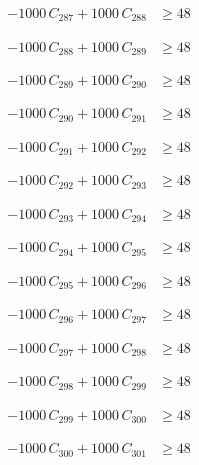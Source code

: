 \documentclass[a4paper,11pt]{article}
\begin{document}
\begin{align}
-1000\,C_{287} + 1000\,C_{288} &\geq 48 \nonumber
\end{align}

\begin{align}
-1000\,C_{288} + 1000\,C_{289} &\geq 48 \nonumber
\end{align}

\begin{align}
-1000\,C_{289} + 1000\,C_{290} &\geq 48 \nonumber
\end{align}

\begin{align}
-1000\,C_{290} + 1000\,C_{291} &\geq 48 \nonumber
\end{align}

\begin{align}
-1000\,C_{291} + 1000\,C_{292} &\geq 48 \nonumber
\end{align}

\begin{align}
-1000\,C_{292} + 1000\,C_{293} &\geq 48 \nonumber
\end{align}

\begin{align}
-1000\,C_{293} + 1000\,C_{294} &\geq 48 \nonumber
\end{align}

\begin{align}
-1000\,C_{294} + 1000\,C_{295} &\geq 48 \nonumber
\end{align}

\begin{align}
-1000\,C_{295} + 1000\,C_{296} &\geq 48 \nonumber
\end{align}

\begin{align}
-1000\,C_{296} + 1000\,C_{297} &\geq 48 \nonumber
\end{align}

\begin{align}
-1000\,C_{297} + 1000\,C_{298} &\geq 48 \nonumber
\end{align}

\begin{align}
-1000\,C_{298} + 1000\,C_{299} &\geq 48 \nonumber
\end{align}

\begin{align}
-1000\,C_{299} + 1000\,C_{300} &\geq 48 \nonumber
\end{align}

\begin{align}
-1000\,C_{300} + 1000\,C_{301} &\geq 48 \nonumber
\end{align}
\end{document}
